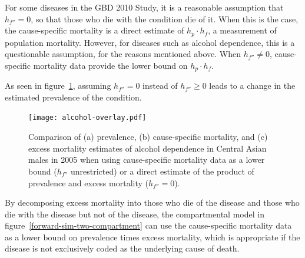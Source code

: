 For some diseases in the GBD 2010 Study, it is a reasonable assumption
that $h_{f''} = 0$, so that those who die with the condition die of
it.  When this is the case, the cause-specific mortality is a direct
estimate of $h_{p} \cdot h_{f}$, a measurement of population
mortality.  However, for diseases such as alcohol dependence, this is
a questionable assumption, for the reasons mentioned above.  When
$h_{f''} \neq 0$, cause-specific mortality data provide the lower
bound on $h_{p} \cdot h_{f}$.

As seen in figure~\ref{fig:app-alcohol compare}, assuming $h_{f''}=0$
instead of $h_{f''}\geq 0$ leads to a change in the estimated prevalence
of the condition.

    \begin{figure}[h]
        \begin{center}
            \texttt{[image: alcohol-overlay.pdf]}
            \caption[Comparison of estimates for alcohol dependence when using
              cause-specific mortality data as a lower bound ($h_{f''}$ unrestricted)
              or a direct estimate of the product of
              prevalence and excess mortality ($h_{f''} = 0$).]{Comparison of (a) prevalence,
              (b) cause-specific mortality, and (c) excess
              mortality estimates of alcohol
              dependence in Central Asian males in 2005 when using
              cause-specific mortality data as a lower bound ($h_{f''}$ unrestricted)
              or a direct estimate of the product of
              prevalence and excess mortality ($h_{f''} = 0$).}
            \label{fig:app-alcohol compare}
        \end{center}
    \end{figure}

By decomposing excess mortality into those who die of the
disease and those who die with the disease but not of the disease, the
compartmental model in figure~\ref{forward-sim-two-compartment} can
use the cause-specific mortality data as a lower bound on prevalence
times excess mortality, which is appropriate if the
disease is not exclusively coded as the underlying cause of death.

